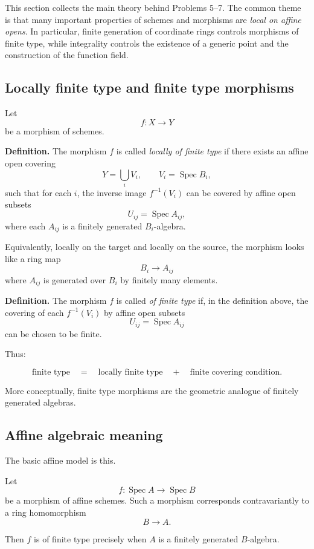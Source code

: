 \documentclass[12pt,a4paper]{article}
\DeclareMathOperator{\Spec}{Spec}
\providecommand{\Spec}{\operatorname{Spec}}
\theoremstyle{notespace}
\begin{document}
This section collects the main theory behind Problems 5--7. The common theme is that many important properties of schemes and morphisms are \emph{local on affine opens}. In particular, finite generation of coordinate rings controls morphisms of finite type, while integrality controls the existence of a generic point and the construction of the function field.

\subsection{Locally finite type and finite type morphisms}

Let
\[
f:X\to Y
\]
be a morphism of schemes.

\textbf{Definition.}
The morphism \(f\) is called \emph{locally of finite type} if there exists an affine open covering
\[
Y=\bigcup_i V_i,
\qquad
V_i=\Spec B_i,
\]
such that for each \(i\), the inverse image \(f^{-1}(V_i)\) can be covered by affine open subsets
\[
U_{ij}=\Spec A_{ij},
\]
where each \(A_{ij}\) is a finitely generated \(B_i\)-algebra.

Equivalently, locally on the target and locally on the source, the morphism looks like a ring map
\[
B_i\to A_{ij}
\]
where \(A_{ij}\) is generated over \(B_i\) by finitely many elements.

\medskip

\textbf{Definition.}
The morphism \(f\) is called \emph{of finite type} if, in the definition above, the covering of each \(f^{-1}(V_i)\) by affine open subsets
\[
U_{ij}=\Spec A_{ij}
\]
can be chosen to be finite.

Thus:

\[
\text{finite type}
\quad =
\quad
\text{locally finite type}
\quad +
\quad
\text{finite covering condition}.
\]

More conceptually, finite type morphisms are the geometric analogue of finitely generated algebras.

\subsection{Affine algebraic meaning}

The basic affine model is this.

Let
\[
f:\Spec A\to \Spec B
\]
be a morphism of affine schemes. Such a morphism corresponds contravariantly to a ring homomorphism
\[
B\to A.
\]

Then \(f\) is of finite type precisely when \(A\) is a finitely generated \(B\)-algebra.
\end{document}
